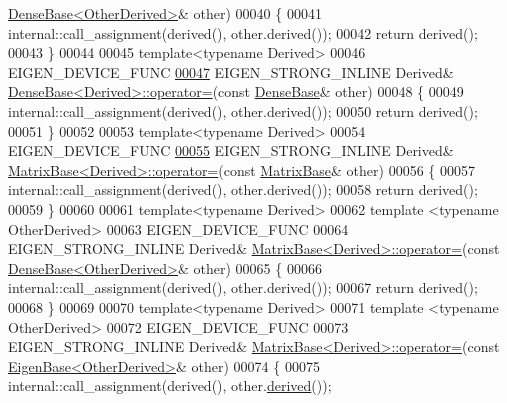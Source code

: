 \begin{DoxyCode}
      \hyperlink{group___core___module_class_eigen_1_1_dense_base}{DenseBase<OtherDerived>}& other)
00040 \{
00041   internal::call\_assignment(derived(), other.derived());
00042   \textcolor{keywordflow}{return} derived();
00043 \}
00044 
00045 \textcolor{keyword}{template}<\textcolor{keyword}{typename} Derived>
00046 EIGEN\_DEVICE\_FUNC
\hyperlink{group___core___module_aae79d5d0d95e60bf2e64d0dc3dfd66a4}{00047} EIGEN\_STRONG\_INLINE Derived& \hyperlink{group___core___module_a581a7a353bd007b5352f11688e3bc5fa}{DenseBase<Derived>::operator=}(\textcolor{keyword}{const} 
      \hyperlink{group___core___module_class_eigen_1_1_dense_base}{DenseBase}& other)
00048 \{
00049   internal::call\_assignment(derived(), other.derived());
00050   \textcolor{keywordflow}{return} derived();
00051 \}
00052 
00053 \textcolor{keyword}{template}<\textcolor{keyword}{typename} Derived>
00054 EIGEN\_DEVICE\_FUNC
\hyperlink{group___core___module_a706a4dd1ee54786e9210de1a4bf02600}{00055} EIGEN\_STRONG\_INLINE Derived& \hyperlink{group___core___module_a706a4dd1ee54786e9210de1a4bf02600}{MatrixBase<Derived>::operator=}(\textcolor{keyword}{const} 
      \hyperlink{group___core___module_class_eigen_1_1_matrix_base}{MatrixBase}& other)
00056 \{
00057   internal::call\_assignment(derived(), other.derived());
00058   \textcolor{keywordflow}{return} derived();
00059 \}
00060 
00061 \textcolor{keyword}{template}<\textcolor{keyword}{typename} Derived>
00062 \textcolor{keyword}{template} <\textcolor{keyword}{typename} OtherDerived>
00063 EIGEN\_DEVICE\_FUNC
00064 EIGEN\_STRONG\_INLINE Derived& \hyperlink{group___core___module_a706a4dd1ee54786e9210de1a4bf02600}{MatrixBase<Derived>::operator=}(\textcolor{keyword}{const} 
      \hyperlink{group___core___module_class_eigen_1_1_dense_base}{DenseBase<OtherDerived>}& other)
00065 \{
00066   internal::call\_assignment(derived(), other.derived());
00067   \textcolor{keywordflow}{return} derived();
00068 \}
00069 
00070 \textcolor{keyword}{template}<\textcolor{keyword}{typename} Derived>
00071 \textcolor{keyword}{template} <\textcolor{keyword}{typename} OtherDerived>
00072 EIGEN\_DEVICE\_FUNC
00073 EIGEN\_STRONG\_INLINE Derived& \hyperlink{group___core___module_a706a4dd1ee54786e9210de1a4bf02600}{MatrixBase<Derived>::operator=}(\textcolor{keyword}{const} 
      \hyperlink{group___core___module_struct_eigen_1_1_eigen_base}{EigenBase<OtherDerived>}& other)
00074 \{
00075   internal::call\_assignment(derived(), other.\hyperlink{group___core___module_a324b16961a11d2ecfd2d1b7dd7946545}{derived}());

\end{DoxyCode}
